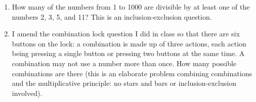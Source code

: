 \documentclass[12pt]{article}
\begin{document}
\begin{enumerate}
\begin{enumerate}
\end{enumerate}

\item  How many of the numbers from 1 to 1000 are divisible by at least one of the numbers  2, 3, 5, and 11?  This is an inclusion-exclusion question.

\item  I amend the combination lock question I did in class so that there are six buttons on the lock:  a combination is made up of three actions,
each action being pressing a single button or pressing two buttons at the same time.  A combination may not use a number more than once.  How many possible combinations are there (this is an elaborate problem combining combinations and the multiplicative principle:  no stars and bars or inclusion-exclusion involved).

\end{enumerate}
\end{document}
